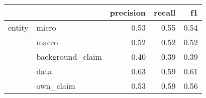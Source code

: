 \begin{tabular}{llrrr}
\toprule
       &           &  precision &  recall &   f1 \\
\midrule
entity & micro &       0.53 &    0.55 & 0.54 \\
       & macro &       0.52 &    0.52 & 0.52 \\
       & background\_claim &       0.40 &    0.39 & 0.39 \\
       & data &       0.63 &    0.59 & 0.61 \\
       & own\_claim &       0.53 &    0.59 & 0.56 \\
\bottomrule
\end{tabular}
